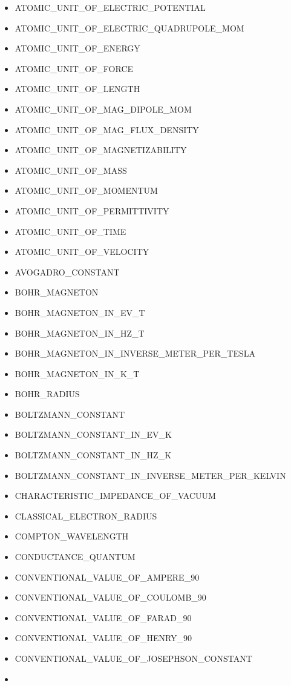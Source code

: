 \begin{itemize}
\item
  ATOMIC\_UNIT\_OF\_ELECTRIC\_POTENTIAL
\item
  ATOMIC\_UNIT\_OF\_ELECTRIC\_QUADRUPOLE\_MOM
\item
  ATOMIC\_UNIT\_OF\_ENERGY
\item
  ATOMIC\_UNIT\_OF\_FORCE
\item
  ATOMIC\_UNIT\_OF\_LENGTH
\item
  ATOMIC\_UNIT\_OF\_MAG\_DIPOLE\_MOM
\item
  ATOMIC\_UNIT\_OF\_MAG\_FLUX\_DENSITY
\item
  ATOMIC\_UNIT\_OF\_MAGNETIZABILITY
\item
  ATOMIC\_UNIT\_OF\_MASS
\item
  ATOMIC\_UNIT\_OF\_MOMENTUM
\item
  ATOMIC\_UNIT\_OF\_PERMITTIVITY
\item
  ATOMIC\_UNIT\_OF\_TIME
\item
  ATOMIC\_UNIT\_OF\_VELOCITY
\item
  AVOGADRO\_CONSTANT
\item
  BOHR\_MAGNETON
\item
  BOHR\_MAGNETON\_IN\_EV\_T
\item
  BOHR\_MAGNETON\_IN\_HZ\_T
\item
  BOHR\_MAGNETON\_IN\_INVERSE\_METER\_PER\_TESLA
\item
  BOHR\_MAGNETON\_IN\_K\_T
\item
  BOHR\_RADIUS
\item
  BOLTZMANN\_CONSTANT
\item
  BOLTZMANN\_CONSTANT\_IN\_EV\_K
\item
  BOLTZMANN\_CONSTANT\_IN\_HZ\_K
\item
  BOLTZMANN\_CONSTANT\_IN\_INVERSE\_METER\_PER\_KELVIN
\item
  CHARACTERISTIC\_IMPEDANCE\_OF\_VACUUM
\item
  CLASSICAL\_ELECTRON\_RADIUS
\item
  COMPTON\_WAVELENGTH
\item
  CONDUCTANCE\_QUANTUM
\item
  CONVENTIONAL\_VALUE\_OF\_AMPERE\_90
\item
  CONVENTIONAL\_VALUE\_OF\_COULOMB\_90
\item
  CONVENTIONAL\_VALUE\_OF\_FARAD\_90
\item
  CONVENTIONAL\_VALUE\_OF\_HENRY\_90
\item
  CONVENTIONAL\_VALUE\_OF\_JOSEPHSON\_CONSTANT
\item

\end{itemize}
